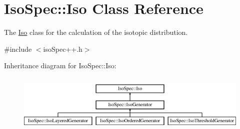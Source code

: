 \hypertarget{class_iso_spec_1_1_iso}{}\section{Iso\+Spec\+:\+:Iso Class Reference}
\label{class_iso_spec_1_1_iso}


The \mbox{\hyperlink{class_iso_spec_1_1_iso}{Iso}} class for the calculation of the isotopic distribution.  




{\ttfamily \#include $<$iso\+Spec++.\+h$>$}

Inheritance diagram for Iso\+Spec\+:\+:Iso\+:\begin{figure}[H]
\begin{center}
\leavevmode
\includegraphics[height=2.800000cm]{class_iso_spec_1_1_iso}
\end{center}
\end{figure}
